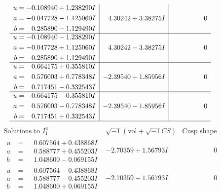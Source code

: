 \documentclass[1p]{elsarticle_modified}
\theoremstyle{definition}
\newcommand{\I}{\sqrt{-1}}
\begin{document}
$$\begin{array}{c|c|c}
\begin{aligned}
u &= -0.108940 + 1.238290 I \\
a &= -0.047728 - 1.125060 I \\
b &= \phantom{-}0.285890 - 1.129490 I\end{aligned}
 & \phantom{-}4.30242 + 3.38275 I & \phantom{-0.000000 } 0 \\ \hline\begin{aligned}
u &= -0.108940 - 1.238290 I \\
a &= -0.047728 + 1.125060 I \\
b &= \phantom{-}0.285890 + 1.129490 I\end{aligned}
 & \phantom{-}4.30242 - 3.38275 I & \phantom{-0.000000 } 0 \\ \hline\begin{aligned}
u &= \phantom{-}0.664175 + 0.355810 I \\
a &= \phantom{-}0.576003 + 0.778348 I \\
b &= \phantom{-}0.717451 - 0.332543 I\end{aligned}
 & -2.39540 + 1.85956 I & \phantom{-0.000000 } 0 \\ \hline\begin{aligned}
u &= \phantom{-}0.664175 - 0.355810 I \\
a &= \phantom{-}0.576003 - 0.778348 I \\
b &= \phantom{-}0.717451 + 0.332543 I\end{aligned}
 & -2.39540 - 1.85956 I & \phantom{-0.000000 } 0\\
 \hline 
 \end{array}$$\newpage$$\begin{array}{c|c|c}  
\text{Solutions to }I^u_{1}& \I (\text{vol} + \sqrt{-1}CS) & \text{Cusp shape}\\
 \hline 
\begin{aligned}
u &= \phantom{-}0.607564 + 0.438868 I \\
a &= \phantom{-}0.588777 + 0.455203 I \\
b &= \phantom{-}1.048600 - 0.069155 I\end{aligned}
 & -2.70359 + 1.56793 I & \phantom{-0.000000 } 0 \\ \hline\begin{aligned}
u &= \phantom{-}0.607564 - 0.438868 I \\
a &= \phantom{-}0.588777 - 0.455203 I \\
b &= \phantom{-}1.048600 + 0.069155 I\end{aligned}
 & -2.70359 - 1.56793 I & \phantom{-0.000000 } 0 \\ \hline\begin{aligned}

\end{aligned}
\end{array}$$
\end{document}
